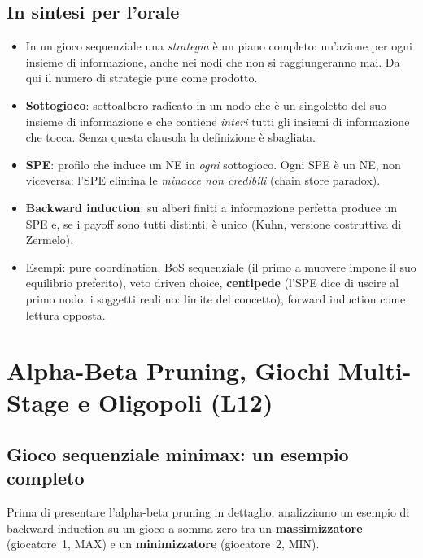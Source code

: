 \documentclass[12pt,a4paper,twoside]{book}
\theoremstyle{plain}
\theoremstyle{definition}
\begin{document}
\section*{In sintesi per l'orale}
\begin{itemize}
  \item In un gioco sequenziale una \emph{strategia} è un piano completo: un'azione per ogni insieme di informazione, anche nei nodi che non si raggiungeranno mai. Da qui il numero di strategie pure come prodotto.
  \item \textbf{Sottogioco}: sottoalbero radicato in un nodo che è un singoletto del suo insieme di informazione e che contiene \emph{interi} tutti gli insiemi di informazione che tocca. Senza questa clausola la definizione è sbagliata.
  \item \textbf{SPE}: profilo che induce un NE in \emph{ogni} sottogioco. Ogni SPE è un NE, non viceversa: l'SPE elimina le \emph{minacce non credibili} (chain store paradox).
  \item \textbf{Backward induction}: su alberi finiti a informazione perfetta produce un SPE e, se i payoff sono tutti distinti, è unico (Kuhn, versione costruttiva di Zermelo).
  \item Esempi: pure coordination, BoS sequenziale (il primo a muovere impone il suo equilibrio preferito), veto driven choice, \textbf{centipede} (l'SPE dice di uscire al primo nodo, i soggetti reali no: limite del concetto), forward induction come lettura opposta.
\end{itemize}

\chapter{Alpha-Beta Pruning, Giochi Multi-Stage e Oligopoli (L12)}
\label{ch:alpha-beta}

\section{Gioco sequenziale minimax: un esempio completo}

Prima di presentare l'alpha-beta pruning in dettaglio, analizziamo un esempio di backward induction su un gioco a somma zero tra un \textbf{massimizzatore} (giocatore~1, MAX) e un \textbf{minimizzatore} (giocatore~2, MIN).
\end{document}
